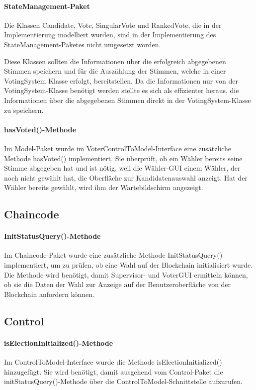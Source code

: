 \documentclass[parskip=full]{scrartcl}
\begin{document}
\paragraph{StateManagement-Paket}
Die Klassen Candidate, Vote, SingularVote und RankedVote, die in der Implementierung modelliert wurden, sind in der Implementierung des StateManagement-Paketes nicht umgesetzt worden.

Diese Klassen sollten die Informationen über die erfolgreich abgegebenen Stimmen speichern und für die Auszählung der Stimmen, welche in einer VotingSystem Klasse erfolgt, bereitstellen.
Da die Informationen nur von der VotingSystem-Klasse benötigt werden
stellte es sich als effizienter heraus, die Informationen über die abgegebenen Stimmen direkt in der VotingSystem-Klasse zu speichern.

\paragraph{hasVoted()-Methode}
Im Model-Paket wurde im VoterControlToModel-Interface eine zusätzliche Methode hasVoted() implementiert. Sie überprüft, ob ein Wähler bereits seine Stimme abgegeben hat und ist nötig, weil die Wähler-GUI einem Wähler, der noch nicht gewählt hat, die Oberfläche zur Kandidatenauswahl anzeigt. Hat der Wähler bereits gewählt, wird ihm der Wartebildschirm angezeigt.

\subsection{Chaincode}
\paragraph{InitStatusQuery()-Methode}
Im Chaincode-Paket wurde eine zusätzliche Methode InitStatusQuery() implementiert, um zu prüfen, ob eine Wahl auf der Blockchain initialisiert wurde. Die Methode wird benötigt, damit Supervisor- und VoterGUI ermitteln können, ob sie die Daten der Wahl zur Anzeige auf der Benutzeroberfläche von der Blockchain anfordern können.

\subsection{Control}
\paragraph{isElectionInitialized()-Methode}
Im ControlToModel-Interface wurde die Methode isElectionInitialized() hinzugefügt. Sie wird benötigt, damit ausgehend vom Control-Paket die initStatusQuery()-Methode über die ControlToModel-Schnittstelle aufzurufen. 
\end{document}
